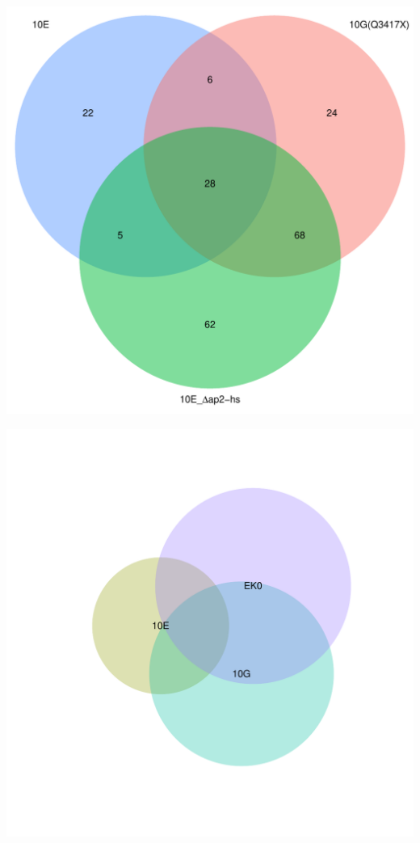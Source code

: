 \documentclass{article}\usepackage[]{graphicx}\usepackage[]{color}
\newenvironment{knitrout}{}{} %
\begin{document}
\begin{knitrout}
\color{fgcolor}

{\centering \includegraphics[width=1\linewidth,height=.4\textheight]{figure/minimal-venn_alltimes_3fc_down_venn-1} 

}



\end{knitrout}
\begin{knitrout}
\color{fgcolor}

{\centering \includegraphics[width=1\linewidth,height=.4\textheight]{figure/minimal-venn_alltimes_3fc_down_euler-1} 

}



\end{knitrout}
\end{document}
